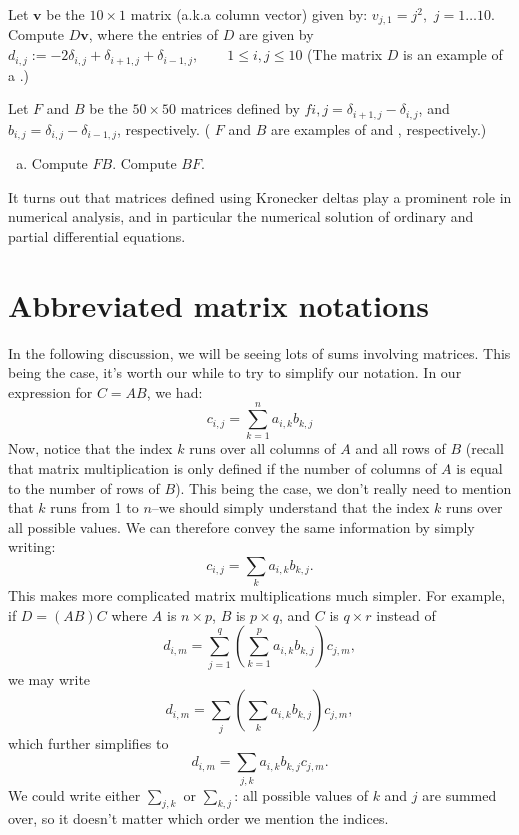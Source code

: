 \begin{exercise}{}
Let $\mathbf{v}$ be the $10 \times 1$ matrix (a.k.a column vector) given by:  $v_{j,1} = j^2,$ $j=1 \ldots 10$. Compute $D\mathbf{v}$, where 
the entries of $D$ are given by 
$\displaystyle  d_{i,j} := -2\delta_{i,j} + \delta_{i+1,j} + \delta_{i-1,j}, \qquad 1 \le i,j \le 10$
(The matrix $D$ is an example of a .)
\end{exercise}

\begin{exercise}{}
Let $F$ and $B$ be the $50 \times 50$ matrices defined by  $f{i,j} = \delta_{i+1,j} - \delta_{i,j}$, and $b_{i,j} = \delta_{i,j}-\delta_{i-1,j}$, respectively.  ( $F$ and $B$ are examples of   and , respectively.)
\begin{enumerate}[(a)]
\item
Compute $FB$.
Compute $BF$. 
\end{enumerate}
\end{exercise}


It turns out that matrices defined using Kronecker deltas play a prominent role in numerical analysis, and in particular the numerical solution of ordinary and partial differential equations.

\section{Abbreviated matrix notations}
\label{sec:SigmaApp:AbbrevMatrixNotations}

In the following discussion, we will be seeing lots of sums involving matrices. This being the case, it's worth our while to try to simplify our notation. In our expression for $C=AB$, we had:
\[ {c}_{i,j}= \sum_{k=1}^n a_{i,k} b_{k,j} \]
Now, notice that the index $k$ runs over all columns of $A$ and all rows of $B$  (recall that matrix multiplication is only defined if the number of columns of $A$ is equal to the number of rows of $B$). This being the case, we don't really need to mention that $k$ runs from 1 to $n$--we should simply understand that the index $k$ runs over all possible values. We can therefore convey the same information by simply writing:
\[ {c}_{i,j}= \sum_{k} a_{i,k} b_{k,j}. \]
This makes more complicated matrix multiplications much simpler. For example, if $D = (AB)C$ where $A$ is $n \times p$, $B$ is $p \times q$, and $C$ is $q \times r$ instead of
\[ {d}_{i,m}= \sum_{j=1}^q \left( \sum_{k=1}^p a_{i,k} b_{k,j} \right) c_{j,m}, \]
 we may write
\[ {d}_{i,m}= \sum_{j} \left( \sum_{k} a_{i,k} b_{k,j} \right) c_{j,m}, \]
which further simplifies to
\[ {d}_{i,m}= \sum_{j,k}  a_{i,k} b_{k,j} c_{j,m}. \]
We could write either $\sum_{j,k}$ or $\sum_{k,j}$:  all possible values of $k$ and $j$ are summed over, so it doesn't matter which order we mention the indices.

